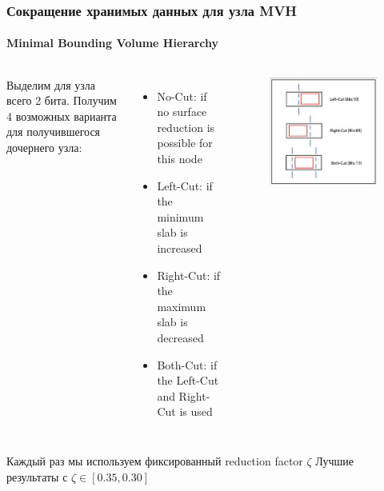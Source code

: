 \documentclass{beamer}
\begin{document}
\begin{frame}[t]
    \frametitle{Сокращение хранимых данных для узла MVH}
    \framesubtitle{Minimal Bounding Volume Hierarchy}
    \begin{columns}
        Выделим для узла всего 2 бита. Получим 4 возможных варианта для получившегося дочернего узла:
        \begin{itemize}
            \item
                No-Cut: if no surface reduction is possible for this node
            \item
                Left-Cut: if the minimum slab is increased
            \item
                Right-Cut: if the maximum slab is decreased
            \item
                Both-Cut: if the Left-Cut and Right-Cut is used
        \end{itemize}
        \begin{figure}
            \includegraphics[keepaspectratio, width=\textwidth]{res/splitting_mvh.png}
        \end{figure}
    \end{columns}

    \begin{block}{}
        Каждый раз мы используем фиксированный reduction factor $\zeta$
        Лучшие результаты с $\zeta \in [ 0.35, 0.30]$
    \end{block}

\end{frame}
\end{document}

